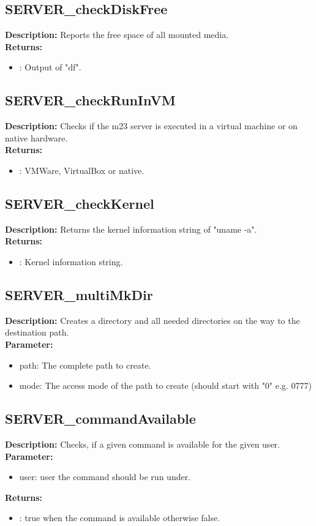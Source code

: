 \subsection{SERVER\_checkDiskFree}
\textbf{Description:} Reports the free space of all mounted media.\\
\textbf{Returns:}
\begin{itemize}
\item : Output of "df".
\end{itemize}

\subsection{SERVER\_checkRunInVM}
\textbf{Description:} Checks if the m23 server is executed in a virtual machine or on native hardware.\\
\textbf{Returns:}
\begin{itemize}
\item : VMWare, VirtualBox or native.
\end{itemize}

\subsection{SERVER\_checkKernel}
\textbf{Description:} Returns the kernel information string of "uname -a".\\
\textbf{Returns:}
\begin{itemize}
\item : Kernel information string.
\end{itemize}

\subsection{SERVER\_multiMkDir}
\textbf{Description:} Creates a directory and all needed directories on the way to the destination path.\\
\textbf{Parameter:}
\begin{itemize}
\item path: The complete path to create.
\item mode: The access mode of the path to create (should start with "0" e.g. 0777)
\end{itemize}

\subsection{SERVER\_commandAvailable}
\textbf{Description:} Checks, if a given command is available for the given user.\\
\textbf{Parameter:}
\begin{itemize}
\item user: user the command should be run under.
\end{itemize}
\textbf{Returns:}
\begin{itemize}
\item : true when the command is available otherwise false.
\end{itemize}

